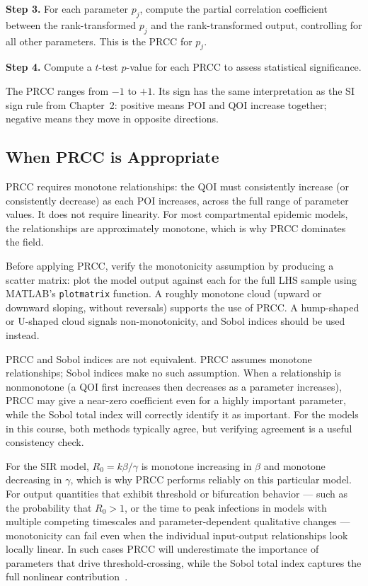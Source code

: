 \textbf{Step 3.} For each parameter $p_j$, compute the partial correlation
coefficient between the rank-transformed $p_j$ and the rank-transformed output,
controlling for all other parameters. This is the PRCC for $p_j$.

\textbf{Step 4.} Compute a $t$-test $p$-value for each PRCC to assess
statistical significance.

The PRCC ranges from $-1$ to $+1$. Its sign has the same interpretation
as the SI sign rule from Chapter~2: positive means POI and QOI increase
together; negative means they move in opposite directions.

\subsection{When PRCC is Appropriate}

PRCC requires monotone relationships: the QOI must consistently increase
(or consistently decrease) as each POI increases, across the full
range of parameter values. It does not require linearity.
For most compartmental epidemic models, the relationships are approximately
monotone, which is why PRCC dominates the field.

Before applying PRCC, verify the monotonicity assumption by producing a
scatter matrix: plot the model output against each \POI for the full
LHS sample using MATLAB's \texttt{plotmatrix} function.
A roughly monotone cloud (upward or downward sloping, without reversals)
supports the use of PRCC. A hump-shaped or U-shaped cloud signals
non-monotonicity, and Sobol indices should be used instead.

PRCC and Sobol indices are not equivalent. PRCC assumes monotone
relationships; Sobol indices make no such assumption. When a relationship
is nonmonotone (a QOI first increases then decreases as a parameter
increases), PRCC may give a near-zero coefficient even for a highly
important parameter, while the Sobol total index will correctly identify
it as important. For the models in this course, both methods typically
agree, but verifying agreement is a useful consistency check.

For the SIR model, $R_0 = k\beta/\gamma$ is monotone increasing in
$\beta$ and monotone decreasing in $\gamma$, which is why PRCC performs
reliably on this particular model.
For output quantities that exhibit threshold or bifurcation behavior ---
such as the probability that $R_0 > 1$, or the time to peak infections
in models with multiple competing timescales and parameter-dependent
qualitative changes --- monotonicity can fail even when the individual
input-output relationships look locally linear.
In such cases PRCC will underestimate the importance of parameters that
drive threshold-crossing, while the Sobol total index captures the full
nonlinear contribution~\cite{saltelli1999effast}.

